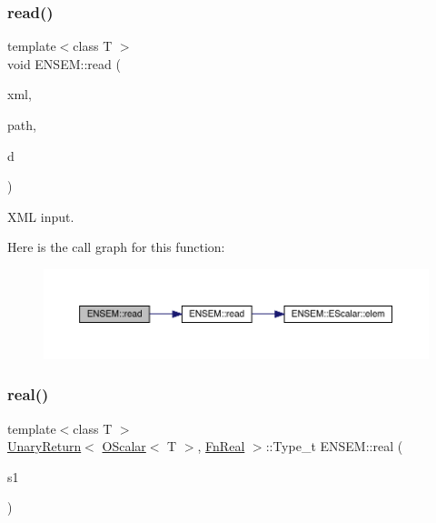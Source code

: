 \subsubsection{\texorpdfstring{read()}{read()}\hspace{0.1cm}{\footnotesize\ttfamily [2/2]}}
{\footnotesize\ttfamily template$<$class T $>$ \\
void E\+N\+S\+E\+M\+::read (\begin{DoxyParamCaption}\item[{\mbox{\hyperlink{classADATXML_1_1XMLReader}{A\+D\+A\+T\+X\+M\+L\+::\+X\+M\+L\+Reader}} \&}]{xml,  }\item[{const std\+::string \&}]{path,  }\item[{\mbox{\hyperlink{classENSEM_1_1OScalar}{O\+Scalar}}$<$ T $>$ \&}]{d }\end{DoxyParamCaption})\hspace{0.3cm}{\ttfamily [inline]}}



X\+ML input. 

Here is the call graph for this function\+:\nopagebreak
\begin{figure}[H]
\begin{center}
\leavevmode
\includegraphics[width=350pt]{d1/d71/group__obsscalar_ga8844f89649f50b51ab6ae9f43064458c_cgraph}
\end{center}
\end{figure}
\mbox{\label{group__obsscalar_gaad780424129e881b69f2435599861fb2}} 
\subsubsection{\texorpdfstring{real()}{real()}}
{\footnotesize\ttfamily template$<$class T $>$ \\
\mbox{\hyperlink{structENSEM_1_1UnaryReturn}{Unary\+Return}}$<$ \mbox{\hyperlink{classENSEM_1_1OScalar}{O\+Scalar}}$<$ T $>$, \mbox{\hyperlink{structENSEM_1_1FnReal}{Fn\+Real}} $>$\+::Type\+\_\+t E\+N\+S\+E\+M\+::real (\begin{DoxyParamCaption}\item[{const \mbox{\hyperlink{classENSEM_1_1OScalar}{O\+Scalar}}$<$ T $>$ \&}]{s1 }\end{DoxyParamCaption})\hspace{0.3cm}{\ttfamily [inline]}}




